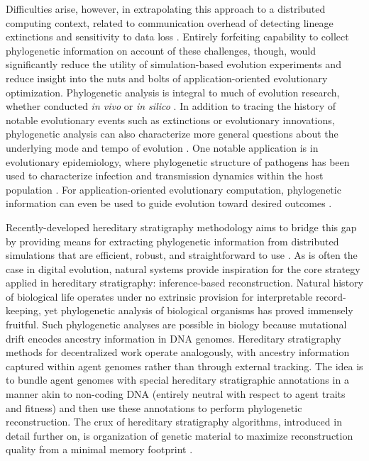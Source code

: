 Difficulties arise, however, in extrapolating this approach to a distributed computing context, related to communication overhead of detecting lineage extinctions and sensitivity to data loss \citep{moreno2024algorithms}.
Entirely forfeiting capability to collect phylogenetic information on account of these challenges, though, would significantly reduce the utility of simulation-based evolution experiments and reduce insight into the nuts and bolts of application-oriented evolutionary optimization.
Phylogenetic analysis is integral to much of evolution research, whether conducted \textit{in vivo} or \textit{in silico} \citep{faithConservationEvaluationPhylogenetic1992, STAMATAKIS2005phylogenetics,frenchHostPhylogenyShapes2023,kim2006discovery,lewinsohnStatedependentEvolutionaryModels2023a,lenski2003evolutionary}.
In addition to tracing the history of notable evolutionary events such as extinctions or evolutionary innovations, phylogenetic analysis can also characterize more general questions about the underlying mode and tempo of evolution \citep{moreno2023toward,hernandez2022can,shahbandegan2022untangling,lewinsohnStatedependentEvolutionaryModels2023a}.
One notable application is in evolutionary epidemiology, where phylogenetic structure of pathogens has been used to characterize infection and transmission dynamics within the host population \citep{giardina2017inference,voznica2022deep}.
For application-oriented evolutionary computation, phylogenetic information can even be used to guide evolution toward desired outcomes \citep{lalejini2024phylogeny,lalejini2024runtime,murphy2008simple,burke2003increased}.


Recently-developed hereditary stratigraphy methodology aims to bridge this gap by providing means for extracting phylogenetic information from distributed simulations that are efficient, robust, and straightforward to use \citep{moreno2022hereditary}.
As is often the case in digital evolution, natural systems provide inspiration for the core strategy applied in hereditary stratigraphy: inference-based reconstruction.
Natural history of biological life operates under no extrinsic provision for interpretable record-keeping, yet phylogenetic analysis of biological organisms has proved immensely fruitful.
Such phylogenetic analyses are possible in biology because mutational drift encodes ancestry information in DNA genomes.
Hereditary stratigraphy methods for decentralized work operate analogously, with ancestry information captured within agent genomes rather than through external tracking.
The idea is to bundle agent genomes with special hereditary stratigraphic annotations in a manner akin to non-coding DNA (entirely neutral with respect to agent traits and fitness) and then use these annotations to perform phylogenetic reconstruction.
The crux of hereditary stratigraphy algorithms, introduced in detail further on, is organization of genetic material to maximize reconstruction quality from a minimal memory footprint \citep{moreno2022hereditary}.

